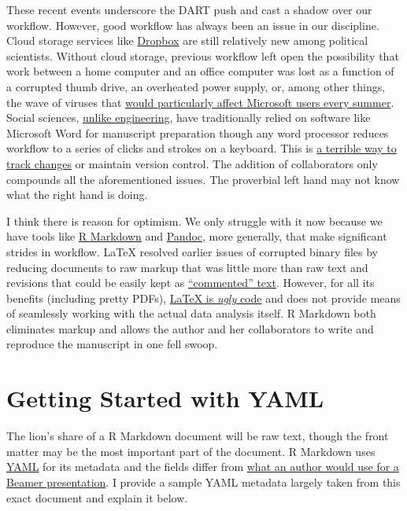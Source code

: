 \documentclass[11pt,]{article}
\begin{document}
These recent events underscore the DART push and cast a shadow over our
workflow. However, good workflow has always been an issue in our
discipline. Cloud storage services like
\href{http://www.dropbox.com}{Dropbox} are still relatively new among
political scientists. Without cloud storage, previous workflow left open
the possibility that work between a home computer and an office computer
was lost as a function of a corrupted thumb drive, an overheated power
supply, or, among other things, the wave of viruses that
\href{http://money.cnn.com/2003/11/05/technology/microsoftbounty/}{would
particularly affect Microsoft users every summer}. Social sciences,
\href{http://kieranhealy.org/blog/archives/2014/01/23/plain-text/}{unlike
engineering}, have traditionally relied on software like Microsoft Word
for manuscript preparation though any word processor reduces workflow to
a series of clicks and strokes on a keyboard. This is
\href{http://www.nytimes.com/2013/04/19/opinion/krugman-the-excel-depression.html}{a
terrible way to track changes} or maintain version control. The addition
of collaborators only compounds all the aforementioned issues. The
proverbial left hand may not know what the right hand is doing.

I think there is reason for optimism. We only struggle with it now
because we have tools like \href{http://rmarkdown.rstudio.com/}{R
Markdown} and \href{http://pandoc.org/}{Pandoc}, more generally, that
make significant strides in workflow. LaTeX resolved earlier issues of
corrupted binary files by reducing documents to raw markup that was
little more than raw text and revisions that could be easily kept as
\href{http://tex.stackexchange.com/questions/11177/how-to-write-hidden-notes-in-a-latex-file}{``commented''
text}. However, for all its benefits (including pretty PDFs),
\href{http://www-rohan.sdsu.edu/~aty/bibliog/latex/gripe.html}{LaTeX is
\emph{ugly} code} and does not provide means of seamlessly working with
the actual data analysis itself. R Markdown both eliminates markup and
allows the author and her collaborators to write and reproduce the
manuscript in one fell swoop.

\section{Getting Started with YAML}\label{getting-started-with-yaml}

The lion's share of a R Markdown document will be raw text, though the
front matter may be the most important part of the document. R Markdown
uses \href{http://www.yaml.org/}{YAML} for its metadata and the fields
differ from
\href{http://svmiller.com/blog/2015/02/moving-from-beamer-to-r-markdown/}{what
an author would use for a Beamer presentation}. I provide a sample YAML
metadata largely taken from this exact document and explain it below.
\end{document}
